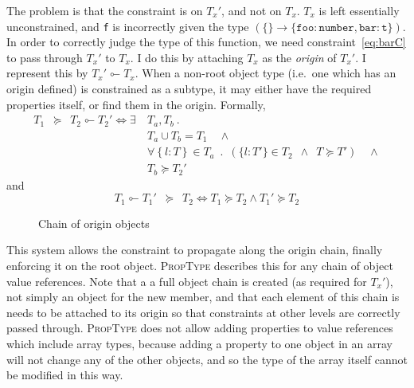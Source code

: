 \documentclass[12pt,a4paper,twoside,openright]{report}
\newcommand*{\orig}{\ensuremath{\!\multimapinv\!}}
\begin{document}
The problem is that the constraint is on $T_x'$, and not on $T_x$. $T_x$ is
left essentially unconstrained, and \texttt{f} is incorrectly given the type
$\mathtt{(\{\} \rightarrow \mathtt{\{foo:number, bar:t\}})}$. In order to
correctly judge the type of this function, we need constraint~\eqref{eq:barC}
to pass through $T_x'$ to $T_x$. I do this by attaching $T_x$ as the
\textit{origin} of $T_x'$. I represent this by $T_x'\orig T_x$.  When a
non-root object type (i.e.~one which has an origin defined) is constrained as a
subtype, it may either have the required properties itself, or find them in the
origin. Formally,
\begin{equation}
  \begin{split}
	T_1\enspace \succeq\enspace T_2\orig T_2' \iff  \exists\ & T_a, T_b\ .\\
	& T_a\cup T_b = T_1 \quad\land  \\
	& \forall \left\{l: T\right\} \in T_a \enspace.\enspace (\{l: T'\}\in T_2\enspace \land \enspace T \succeq T') \quad\land \\
	& T_b \succeq T_2'
  \end{split}
\end{equation}
and
\begin{equation}
  T_1\orig T_1'\enspace \succeq \enspace T_2 \iff T_1\succeq T_2 \land T_1' \succeq T_2
\end{equation}

\begin{figure}
  \begin{center}
  \end{center}
  \caption{Chain of origin objects}
  \label{fig:origin}
\end{figure}
This system allows the constraint to propagate along the origin chain, finally
enforcing it on the root object. \textsc{PropType} describes this for any chain of
object value references. Note that a a full object chain is created (as
required for $T_x'$), not simply an object for the new member, and that each
element of this chain is needs to be attached to its origin so that constraints
at other levels are correctly passed through. \textsc{PropType} does not allow adding
properties to value references which include array types, because adding a
property to one object in an array will not change any of the other objects,
and so the type of the array itself cannot be modified in this way.
\end{document}
